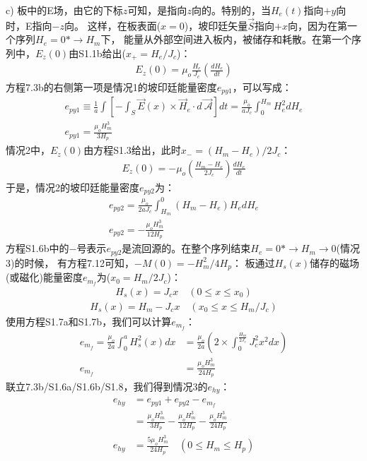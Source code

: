 c) 板中的E场，由它的下标$z$可知，是指向$z$向的。特别的，当$H_e(t)$指向$+y$向时，E指向$-z$向。
这样，在板表面($x=0$)，坡印廷矢量$\vec{S}$指向$+x$向，因为在第一个序列$H_e=0*\rightarrow H_m$下，
能量从外部空间进入板内，被储存和耗散。在第一个序列中，$E_z(0)$由S1.1b给出($x_+=H_e/J_c$)：
\begin{align*}%
E_z(0)=\mu_o\frac{H_e}{J_c}\left(\frac{dH_e}{dt}\right) \tag{S1.5a}
\end{align*}
方程7.3b的右侧第一项是情况1的坡印廷能量密度$e_{py1}$，可以写成：
\begin{align*}%
e_{py1}\equiv\frac{1}{a}\int\left[-\int_{S}\vec{E}(x)\times\vec{H}_e\cdot d\vec{\ \mathcal{A}}\right]dt=\frac{\mu_o}{aJ_c}\int_{0}^{H_m}H_{e}^{2}dH_e\\
e_{py1}=\frac{\mu_oH_{m}^{3}}{3H_p} \tag{S1.6a}
\end{align*}
情况2中，$E_z(0)$由方程S1.3给出，此时$x_-=(H_m-H_e)/2J_c$：
\begin{align*}%
E_z(0)=-\mu_o\left(\frac{H_m-H_e}{2J_c}\right)\frac{dH_e}{dt} \tag{S1.5b}
\end{align*}
于是，情况2的坡印廷能量密度$e_{py2}$为：
\begin{align*}%
e_{py2}=\frac{\mu_o}{2aJ_c}\int_{H_m}^{0}(H_m-H_e)H_edH_e\\
e_{py2}=-\frac{\mu_oH_{m}^{3}}{12H_p} \tag{S1.6b}
\end{align*}
方程S1.6b中的$-$号表示$e_{py2}$是流回源的。在整个序列结束$H_e=0*\rightarrow H_m\rightarrow 0$(情况3)的时候，
有方程7.12可知，$-M(0)=-H_m^2/4H_p$：
板通过$H_s(x)$储存的磁场(或磁化)能量密度$e_{m_f}$为($x_0=H_m/2J_c$)：
\begin{align*}%
H_s(x)=J_cx  \quad      (0\leq x\leq x_0) \tag{S1.7a}
\end{align*}
\begin{align*}%
H_s(x)=H_m-J_cx  \quad  (x_0\leq x\leq H_m/J_c) \tag{S1.7b}
\end{align*}
使用方程S1.7a和S1.7b，我们可以计算$e_{m_f}$：
\begin{align*}%
e_{m_f}=\frac{\mu_o}{2a}\int_{0}^{a}H_{s}^{2}(x)dx&=\frac{\mu_o}{2a}\left(2\times\int_{0}^{\frac{H_m}{2J_c}}J_{c}^{2}x^2dx\right)\\
e_{m_f}&=\frac{\mu_oH_{m}^{3}}{24H_p} \tag{S1.8}
\end{align*}
联立7.3b/S1.6a/S1.6b/S1.8，我们得到情况3的$e_{hy}$：
\begin{align*}%
e_{hy}&=e_{py1}+e_{py2}-e_{m_f} \\
&=\frac{\mu_oH_{m}^{3}}{3H_p}-\frac{\mu_oH_{m}^{3}}{12H_p}-\frac{\mu_oH_{m}^{3}}{24H_p}\\
e_{hy}&=\frac{5\mu_oH_{m}^{3}}{24H_p}   \quad    (0\leq H_m\leq H_p) \tag{7.15a}
\end{align*}

